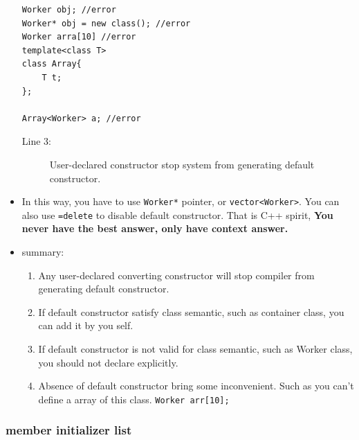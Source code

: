 \documentclass[a4paper,11pt,twoside]{book}
\begin{document}
\begin{itemize}
\begin{lstlisting}
Worker obj; //error
Worker* obj = new class(); //error
Worker arra[10] //error
template<class T>
class Array{
	T t;
};

Array<Worker> a; //error
\end{lstlisting}
\begin{description}
	\item[Line 3:] User-declared constructor stop system from generating default constructor.
\end{description}

	
    \item In this way, you have to use \texttt{Worker*} pointer, or \texttt{vector<Worker>}.  You can also use \texttt{=delete} to disable default constructor. That is C++ spirit, \textbf{You never have the best answer, only have context answer. }

\item summary:
\begin{enumerate}
	\item Any user-declared converting constructor will stop compiler from generating default constructor.

	\item If default constructor satisfy class semantic, such as container class, you can add it by you self.

	\item If default constructor is not valid for class semantic, such as Worker class, you should not declare explicitly. 

	\item Absence of default constructor bring some inconvenient. Such as you can't define a array of this class. \texttt{Worker arr[10];} 
\end{enumerate}
	
\end{itemize}

\subsubsection{member initializer list}
\end{document}
